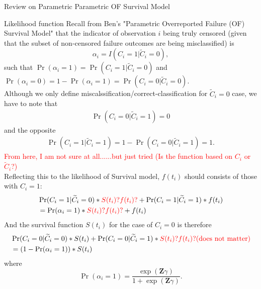 \documentclass[a4paper, 12pt]{article}
\makeatletter
\renewcommand{\section}{\@startsection
	{section}    {1}    {0mm}    {-0.7\baselineskip}    {0.08\baselineskip}    {\normalfont\large\sc\center\bf}}
\renewcommand{\subsection}{\@startsection
	{subsection}    {2}    {0mm}    {-0.5\baselineskip}    {0.01\baselineskip}    {\normalfont\normalsize\itshape\center}}
\makeatother
\begin{document}
\pagebreak \renewcommand{\thefigure}{\arabic{figure}} %
\setcounter{figure}{0} \renewcommand{\thepage}{\arabic{page}} %
\setcounter{page}{1} \pagestyle{plain} \doublespacing
\section{Review on Parametric Parametric OF Survival Model}
\subsection{Likelihood function}
\noindent Recall from Ben's "Parametric Overreported Failure (OF) Survival Model" that the
indicator of observation $i$ being truly censored (given that the subset of non-censored failure
outcomes are being misclassified) is%
\begin{equation}
\alpha_i =I(C_i = 1|\widetilde{C}_{i}=0),
\end{equation}
such that $\Pr(\alpha_i = 1) = \Pr(C_i = 1|\widetilde{C}_{i}=0)$ and $\Pr(\alpha_i = 0) = 1-\Pr(\alpha_i = 1) = \Pr(C_i = 0|\widetilde{C}_{i}=0)$. \\ \newline
Although we only define miscalssification/correct-classification for $\widetilde{C}_{i}=0$ case, we have to note that 
\begin{equation}
\begin{aligned}
 \Pr(C_i =0|\widetilde{C}_{i}=1) = 0
\end{aligned}
\end{equation}
and the opposite
\begin{equation}
\begin{aligned}
\Pr(C_i = 1|\widetilde{C}_{i}=1) = 1- \Pr(C_i =0|\widetilde{C}_{i}=1) = 1.
\end{aligned}
\end{equation}
\textcolor{red}{From here, I am not sure at all......but just tried (Is the function based on $C_i$ or $\widetilde{C}_{i}$?)}\\
Reflecting this to the likelihood of Survival model, $f(t_i)$ should consists of those with $C_i = 1$:
\begin{equation}
\begin{aligned}
&\Pr(C_i = 1|\widetilde{C}_{i}=0)\ast \textcolor{red}{S(t_i)? f(t_i)?}+\Pr(C_i = 1|\widetilde{C}_{i}=1)\ast f(t_{i})\\&
=\Pr(\alpha _{i} = 1) \ast \textcolor{red}{S(t_i)? f(t_i)?}+ f(t_i)
\end{aligned}
\end{equation}
And the survival function $S(t_i)$ for the case of $C_i = 0$ is therefore%
\begin{equation}
\begin{aligned}
&\Pr(C_i = 0|\widetilde{C}_{i}=0)\ast S(t_i)+\Pr(C_i = 0|\widetilde{C}_{i}=1)\ast\textcolor{red}{S(t_i)? f(t_i)? \mbox{(does not matter)}}\\&
= (1 - \Pr(\alpha _{i} = 1)) \ast S(t_i) 
\end{aligned}
\end{equation}
where
\begin{equation}
\Pr(\alpha _{i} = 1)=\frac{\exp (\mathbf{Z}\gamma )}{1+\exp (\mathbf{Z}\gamma )}.
\end{equation}
\end{document}
